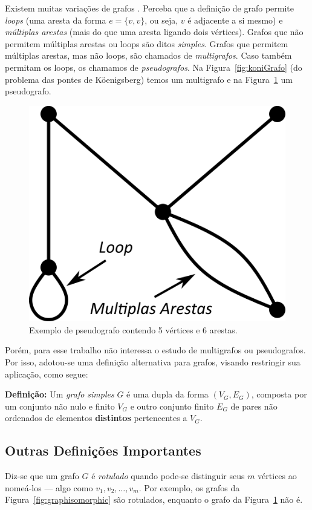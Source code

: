 \documentclass[a4paper,12pt]{article}
\begin{document}
Existem muitas variações de grafos \cite{graphTheoryFHarary}. Perceba que a definição de grafo permite \textit{loops} (uma aresta da forma $e = \{v,v\}$, ou seja, $v$ é adjacente a si mesmo) e \textit{múltiplas arestas} (mais do que uma aresta ligando dois vértices). Grafos que não permitem múltiplas arestas ou loops são ditos \textit{simples}. Grafos que permitem múltiplas arestas, mas não loops, são chamados de \textit{multigrafos}. Caso também permitam os loops, os chamamos de \textit{pseudografos}. Na Figura~\ref{fig:koniGrafo} (do problema das pontes de Köenigsberg) temos um multigrafo e na Figura~\ref{fig:pseudograph} um pseudografo.

\begin{figure}[H]
	\begin{center}
		\includegraphics[width=0.28\linewidth]{figures/pseudograph.png}
	\end{center}
	\caption{Exemplo de pseudografo contendo 5 vértices e 6 arestas.}
	\label{fig:pseudograph}
\end{figure}

Porém, para esse trabalho não interessa o estudo de multigrafos ou pseudografos. Por isso, adotou-se uma definição alternativa para grafos, visando restringir sua aplicação, como segue:

\begin{center}
	\begin{minipage}{0.9 \linewidth}
		\textbf{Definição:} Um \textit{grafo simples} $G$ é uma dupla da forma $(V_G,E_G)$, composta por um conjunto não nulo e finito $V_G$ e outro conjunto finito $E_G$ de pares não ordenados de elementos \textbf{distintos} pertencentes a $V_G$.
	\end{minipage}
\end{center} 

\subsection{Outras Definições Importantes}

Diz-se que um grafo $G$ é \textit{rotulado} quando pode-se distinguir seus $m$ vértices ao nomeá-los --- algo como $v_1, v_2, \dots, v_m$. Por exemplo, os grafos da Figura~\ref{fig:graphisomorphic} são rotulados, enquanto o grafo da Figura~\ref{fig:pseudograph} não é.
\end{document}
